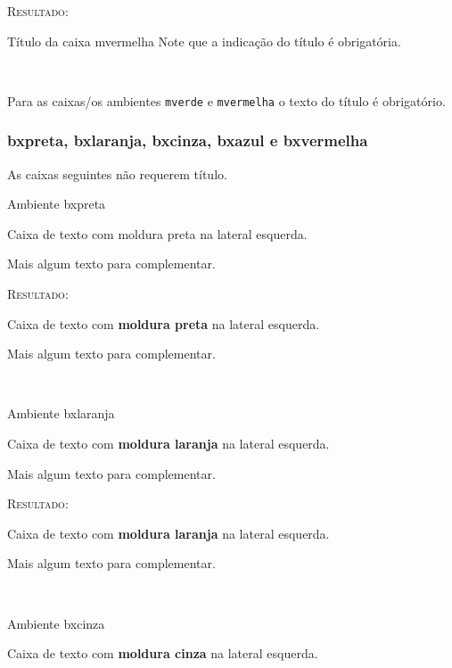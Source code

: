 \documentclass[a4paper,12pt,oneside,openright,extrafontsizes,openbib]{memoir}
\begin{document}
{\textsc{Resultado:}
\begin{mvermelha}{Título da caixa mvermelha}
	Note que a indicação do título é obrigatória.
\end{mvermelha}
\ \\

\noindent{} 

Para as caixas/os ambientes \verb|mverde| e \verb|mvermelha| o texto do título é obrigatório.

\subsubsection{bxpreta, bxlaranja, bxcinza, bxazul e bxvermelha}

As caixas seguintes não requerem título.

\begin{codex}{Ambiente bxpreta}
	\begin{bxpreta}
	Caixa de texto com moldura preta na lateral esquerda. 
	
	Mais algum texto para complementar.   
	\end{bxpreta} 
\end{codex}

\textsc{Resultado:}
\begin{bxpreta}
	Caixa de texto com \textbf{moldura preta} na lateral esquerda. 
	
	Mais algum texto para complementar.     
\end{bxpreta} 
\ \\

\begin{codex}{Ambiente bxlaranja}
	\begin{bxlaranja}
	Caixa de texto com \textbf{moldura laranja} na lateral esquerda.  
	
	Mais algum texto para complementar.  
	\end{bxlaranja}
\end{codex}

\textsc{Resultado:}
\begin{bxlaranja}
	Caixa de texto com \textbf{moldura laranja} na lateral esquerda.
	
	Mais algum texto para complementar.   
\end{bxlaranja}
\ \\

\begin{codex}{Ambiente bxcinza}
	\begin{bxcinza}
	Caixa de texto com \textbf{moldura cinza} na lateral esquerda. 
	

\end{bxcinza}
\end{codex}}
\end{document}
